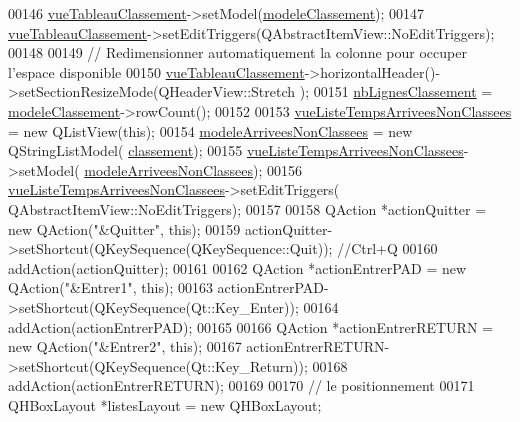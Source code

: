 \begin{DoxyCode}
00146     \hyperlink{class_i_h_m_chrono_cross_a199204276756844adbd6ca3c9030ad2f}{vueTableauClassement}->setModel(\hyperlink{class_i_h_m_chrono_cross_ac25c95280801f36c43a1c41cf2fa253e}{modeleClassement});
00147     \hyperlink{class_i_h_m_chrono_cross_a199204276756844adbd6ca3c9030ad2f}{vueTableauClassement}->setEditTriggers(QAbstractItemView::NoEditTriggers);
00148 
00149     \textcolor{comment}{// Redimensionner automatiquement la colonne pour occuper l'espace disponible}
00150     \hyperlink{class_i_h_m_chrono_cross_a199204276756844adbd6ca3c9030ad2f}{vueTableauClassement}->horizontalHeader()->setSectionResizeMode(QHeaderView::Stretch
      );
00151     \hyperlink{class_i_h_m_chrono_cross_a86ed3469ca99988211bcf0970527c119}{nbLignesClassement} = \hyperlink{class_i_h_m_chrono_cross_ac25c95280801f36c43a1c41cf2fa253e}{modeleClassement}->rowCount();
00152 
00153     \hyperlink{class_i_h_m_chrono_cross_aaf04338d882f708e57d9872b1c82b7a0}{vueListeTempsArriveesNonClassees} = \textcolor{keyword}{new} QListView(\textcolor{keyword}{this});
00154     \hyperlink{class_i_h_m_chrono_cross_a12a210c6a93f70df764841b7d322b05c}{modeleArriveesNonClassees} = \textcolor{keyword}{new} QStringListModel(
      \hyperlink{class_i_h_m_chrono_cross_a49236628e14e516e1ab7a181eac8fea8}{classement});
00155     \hyperlink{class_i_h_m_chrono_cross_aaf04338d882f708e57d9872b1c82b7a0}{vueListeTempsArriveesNonClassees}->setModel(
      \hyperlink{class_i_h_m_chrono_cross_a12a210c6a93f70df764841b7d322b05c}{modeleArriveesNonClassees});
00156     \hyperlink{class_i_h_m_chrono_cross_aaf04338d882f708e57d9872b1c82b7a0}{vueListeTempsArriveesNonClassees}->setEditTriggers(
      QAbstractItemView::NoEditTriggers);
00157 
00158     QAction *actionQuitter = \textcolor{keyword}{new} QAction(\textcolor{stringliteral}{"&Quitter"}, \textcolor{keyword}{this});
00159     actionQuitter->setShortcut(QKeySequence(QKeySequence::Quit)); \textcolor{comment}{//Ctrl+Q}
00160     addAction(actionQuitter);
00161 
00162     QAction *actionEntrerPAD = \textcolor{keyword}{new} QAction(\textcolor{stringliteral}{"&Entrer1"}, \textcolor{keyword}{this});
00163     actionEntrerPAD->setShortcut(QKeySequence(Qt::Key\_Enter));
00164     addAction(actionEntrerPAD);
00165 
00166     QAction *actionEntrerRETURN = \textcolor{keyword}{new} QAction(\textcolor{stringliteral}{"&Entrer2"}, \textcolor{keyword}{this});
00167     actionEntrerRETURN->setShortcut(QKeySequence(Qt::Key\_Return));
00168     addAction(actionEntrerRETURN);
00169 
00170     \textcolor{comment}{// le positionnement}
00171     QHBoxLayout *listesLayout = \textcolor{keyword}{new} QHBoxLayout;

\end{DoxyCode}

